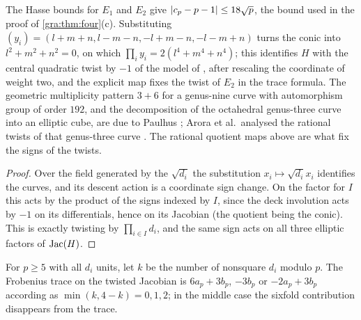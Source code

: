 The Hasse bounds for $E_1$ and $E_2$ give $\lvert c_p-p-1\rvert\le18\sqrt p$, the
bound used in the proof of \cref{gra:thm:four}(c). Substituting
$(y_i)=(l+m+n,l-m-n,-l+m-n,-l-m+n)$ turns the conic into
$l^2+m^2+n^2=0$, on which $\prod_iy_i=2(l^4+m^4+n^4)$; this identifies
$H$ with the central quadratic twist by $-1$ of the model of
\cite[Eq.~(1.4.1)]{Arora2016Twisting}, after rescaling the coordinate of
weight two, and the explicit map fixes the twist of $E_2$ in the trace
formula. The geometric multiplicity pattern $3+6$ for a genus-nine curve
with automorphism group of order $192$, and the decomposition of the
octahedral genus-three curve into an elliptic cube, are due to Paulhus
\cite[\S\S3.2.4, 4.2]{Paulhus2008Decomposing}; Arora et al.\ analysed the
rational twists of that genus-three curve \cite{Arora2016Twisting}. The
rational quotient maps above are what fix the signs of the twists.


\begin{proof}
Over the field generated by the $\sqrt{d_i}$ the substitution
$x_i\mapsto\sqrt{d_i}x_i$ identifies the curves, and its descent action is
a coordinate sign change. On the factor for $I$ this acts by the product of
the signs indexed by $I$, since the deck involution acts by $-1$ on its
differentials, hence on its Jacobian (the quotient being the conic). This
is exactly twisting by $\prod_{i\in I}d_i$, and the same sign acts on all
three elliptic factors of $\operatorname{Jac}(H)$.
\end{proof}

For $p\ge5$ with all $d_i$ units, let $k$ be the number of nonsquare $d_i$
modulo $p$. The Frobenius trace on the twisted Jacobian is $6a_p+3b_p$,
$-3b_p$ or $-2a_p+3b_p$ according as $\min(k,4-k)=0,1,2$; in the middle
case the sixfold contribution disappears from the trace.

